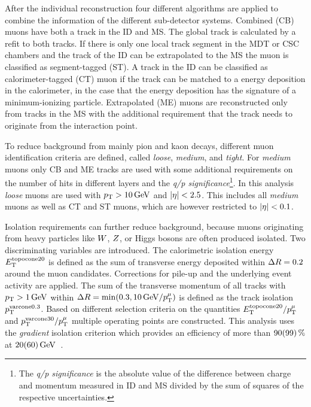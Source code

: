 After the individual reconstruction four different algorithms are applied to combine the information of the different
sub-detector systems.
Combined (CB) muons have both a track in the ID and MS\@. The global track is calculated by a refit to both tracks.
If there is only one local track segment in the MDT or CSC chambers and the track of the ID can be extrapolated to the MS
the muon is classified as segment-tagged (ST).
A track in the ID can be classified as calorimeter-tagged (CT) muon if the track can be matched to a energy deposition
in the calorimeter, in the case that the energy deposition has the signature of a minimum-ionizing particle.
Extrapolated (ME) muons are reconstructed only from tracks in the MS with the additional requirement that the track
needs to originate from the interaction point.

To reduce background from mainly pion and kaon decays, different muon identification criteria are defined, called
\emph{loose}, \emph{medium}, and \emph{tight}.
For \emph{medium} muons only CB and ME tracks are used with some additional requirements on the number of hits in
different layers and the \emph{q/p significance}\footnote{The \emph{q/p significance} is the absolute value of the
difference between charge and momentum measured in ID and MS divided by the sum of squares of the respective uncertainties.}.
In this analysis \emph{loose} muons are used with $\pt > \unit[10]{GeV}$ and $\left|\eta\right| < 2.5$.
This includes all \emph{medium} muons as well as CT and ST muons, which are however restricted to $\left|\eta\right| < 0.1$.

Isolation requirements can further reduce background, because muons originating from heavy particles like $W$, $Z$,
or Higgs bosons are often produced isolated. Two discriminating variables are introduced.
The calorimetric isolation energy $E_\text{T}^{\text{topocone}20}$ is defined as the sum of transverse energy deposited within
$\Delta R = 0.2$ around the muon candidates.
Corrections for pile-up and the underlying event activity are applied.
The sum of the transverse momentum of all tracks with $\pt > \unit[1]{GeV}$ within $\dr = \min(0.3, \unit[10]{GeV} / \pt^\mu)$
is defined as the track isolation $p_\text{T}^{\text{varcone}0.3}$.
Based on different selection criteria on the quantities $E_\text{T}^{\text{topocone}20} / p_\text{T}^\mu$ and
$p_\text{T}^{\text{varcone}30} / p_\text{T}^\mu$ multiple operating points are constructed.
This analysis uses the \emph{gradient} isolation criterion which provides an efficiency of more than
$\unit[90(99)]{\%}$ at $\unit[20(60)]{GeV}$~\cite{PERF-2015-10}.

